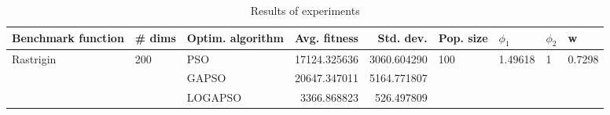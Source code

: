 \begin{table}
\centering
\caption{Results of experiments}
\begin{tabular}{lllrrllll}
\toprule
        Benchmark function &              \# dims & Optim. algorithm &  Avg. fitness &   Std. dev. &            Pop. size &               $\phi_{1}$ &         $\phi_{2}$ &                       w \\
\midrule
\multirow{3}{*}{Rastrigin} & \multirow{3}{*}{200} &              PSO &  17124.325636 & 3060.604290 & \multirow{3}{*}{100} & \multirow{3}{*}{1.49618} & \multirow{3}{*}{1} & \multirow{3}{*}{0.7298} \\
                           &                      &            GAPSO &  20647.347011 & 5164.771807 &                      &                          &                    &                         \\
                           &                      &          LOGAPSO &   3366.868823 &  526.497809 &                      &                          &                    &                         \\
\bottomrule
\end{tabular}
\end{table}
